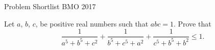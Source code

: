 Problem Shortlist BMO 2017

Let $ a $, $ b$, $ c$,   be positive real numbers such that $abc= 1 $. Prove that$$\frac{1}{a^{5}+b^{5}+c^{2}}+\frac{1}{b^{5}+c^{5}+a^{2}}+\frac{1}{c^{5}+b^{5}+b^{2}}\leq 1 . $$